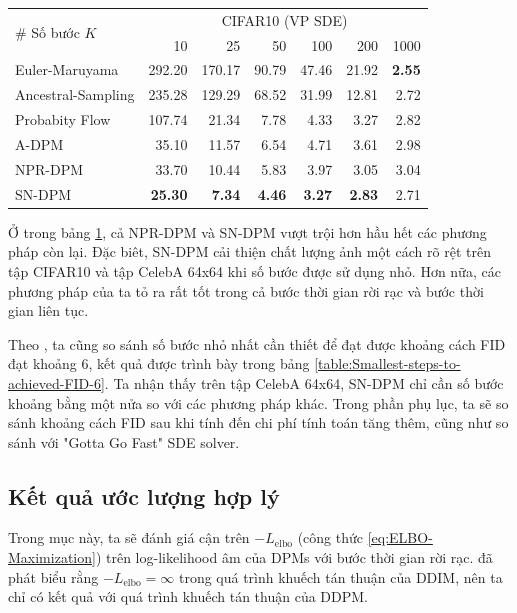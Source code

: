 \documentclass[14pt, a4paper]{article}
\numberwithin{equation}{section}
\numberwithin{figure}{section}
\numberwithin{dl}{section}
\numberwithin{md}{section}
\numberwithin{bd}{section}
\numberwithin{dn}{section}
\numberwithin{hq}{section}
\begin{document}
\begin{table}[h!]
\begin{center}
{\begin{tabular}{ lrrrrrr  }
                    \multirow{2}{*}{\# Số bước $K$} & \multicolumn{6}{c}{CIFAR10 (VP SDE)} \\ \cline{2-7}
                    & 10 & 25 & 50 & 100 & 200 & 1000 \\
                    \hline
                    Euler-Maruyama & 292.20 & 170.17 & 90.79 & 47.46 & 21.92 & \textbf{2.55} \\
                    Ancestral-Sampling & 235.28 & 129.29 & 68.52 & 31.99 & 12.81 & 2.72 \\
                    Probabity Flow & 107.74 & 21.34 & 7.78 & 4.33 & 3.27 & 2.82 \\
                    A-DPM & 35.10 &  11.57 & 6.54 & 4.71 & 3.61 & 2.98 \\
                    NPR-DPM & 33.70 & 10.44 & 5.83 & 3.97 & 3.05 & 3.04 \\
                    SN-DPM & \textbf{25.30} & \textbf{7.34} & \textbf{4.46} & \textbf{3.27} & \textbf{2.83} & 2.71 \\
                    \hline
                \end{tabular}
            }
        \end{center}
        \label{table:FID-CIFAR10}
    \end{table}

    Ở trong bảng \ref{table:FID-CIFAR10}, cả NPR-DPM và SN-DPM vượt trội hơn hầu hết các phương pháp còn lại.
    Đặc biêt, SN-DPM cải thiện chất lượng ảnh một cách rõ rệt trên tập CIFAR10 và tập CelebA 64x64 khi số bước được sử dụng nhỏ.
    Hơn nữa, các phương pháp của ta tỏ ra rất tốt trong cả bước thời gian rời rạc và bước thời gian liên tục.

    Theo \cite{bao2021analytic}, ta cũng so sánh số bước nhỏ nhất cần thiết để đạt được khoảng cách FID đạt khoảng 6,
    kết quả được trình bày trong bảng \ref{table:Smallest-steps-to-achieved-FID-6}.
    Ta nhận thấy trên tập CelebA 64x64, SN-DPM chỉ cần số bước khoảng bằng một nửa so với các phương pháp khác.
    Trong phần phụ lục, ta sẽ so sánh khoảng cách FID sau khi tính đến chi phí tính toán tăng thêm,
    cũng như so sánh với "Gotta Go Fast" SDE solver.

    \subsection{Kết quả ước lượng hợp lý}

    Trong mục này, ta sẽ đánh giá cận trên $-L_{\mathrm{elbo}}$ (công thức \ref{eq:ELBO-Maximization}) trên log-likelihood âm của DPMs với bước thời gian rời rạc.
    \cite{bao2021analytic} đã phát biểu rằng $-L_{\mathrm{elbo}}=\infty$ trong quá trình khuếch tán thuận của DDIM, nên ta chỉ có kết quả với quá trình khuếch tán thuận của DDPM.
\end{document}
